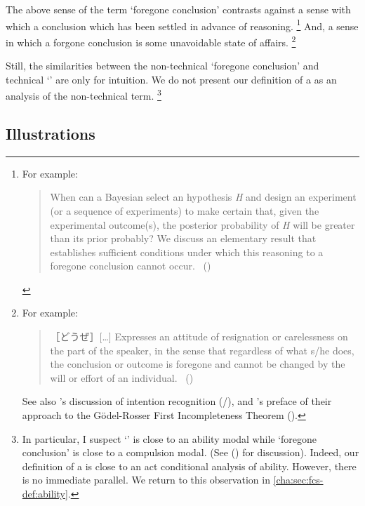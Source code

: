 \begin{note}
  The above sense of the term `foregone conclusion' contrasts against a sense with which a conclusion which has been settled in advance of reasoning.%
  \footnote{
    For example:
    \begin{quote}
      When can a Bayesian select an hypothesis \emph{H} and design an experiment (or a sequence of experiments) to make certain that, given the experimental outcome(s), the posterior probability of \emph{H} will be greater than its prior probably?
      We discuss an elementary result that establishes sufficient conditions under which this reasoning to a foregone conclusion cannot occur.%
      \mbox{ }\hfill\mbox{(\cite[1228]{Kadane:1996vu})}
    \end{quote}
  }
  And, a sense in which a forgone conclusion is some unavoidable state of affairs.%
  \footnote{
    For example:
    \begin{quote}
      ［どうぜ］[\dots] Expresses an attitude of resignation or carelessness on the part of the speaker, in the sense that regardless of what s/he does, the conclusion or outcome is foregone and cannot be changed by the will or effort of an individual.%
      \mbox{ }\hfill\mbox{(\cite[332--333]{kurufushamashii:2015un})}
    \end{quote}
    See also \citeauthor{Grice:1957vg}'s discussion of intention recognition (\citeyear[385]{Grice:1957vg}/\citeyear[219]{Grice:1989uf}), and \citeauthor{Machover:1996vu}'s preface of their approach to the G\"{o}del-Rosser First Incompleteness Theorem (\citeyear[viii]{Machover:1996vu}).
  }

  Still, the similarities between the non-technical `foregone conclusion' and technical `\fc{}' are only for intuition.
  We do not present our definition of a \fc{} as an analysis of the non-technical term.%
  \footnote{
    \label{fn:fc-ability}
    In particular, I suspect `' is close to an ability modal while `foregone conclusion' is close to a compulsion modal.
    (See (\cite{Mandelkern:2017aa}) for discussion).
    Indeed, our definition of a \fc{} is close to an act conditional analysis of ability.
    However, there is no immediate parallel.
    We return to this observation in \autoref{cha:sec:fcs-def:ability}.
  }
\end{note}

\subsection{Illustrations}
\label{cha:fcs:illu}

